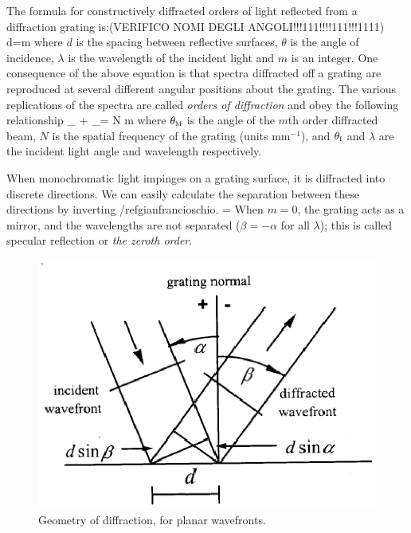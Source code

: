 The formula for constructively diffracted orders of light reflected from a diffraction grating is:(VERIFICO NOMI DEGLI ANGOLI!!!111!!!!111!!!1111)
\mate
d\sin\theta=m\lambda
\label{gianfrancioschio}
\atem
where $d$ is the spacing between reflective surfaces, $\theta$ is the angle of incidence, $\lambda$ is the wavelength of the incident light and $m$ is an integer. One consequence of the above equation is that spectra diffracted off a grating are reproduced at several different angular positions about the grating. The various replications of the spectra are called \textit{orders of diffraction} and obey the following relationship 
\mate
\sin\theta_{} + \sin\theta_{}= N m \lambda
\atem
where $\theta_{\mbox{\footnotesize{\scshape{m}}}}$ is the angle of the $m$th order diffracted beam, $N$ is the spatial frequency of the grating (units mm$^{-1}$), and $\theta_{\mbox{\footnotesize{\scshape{i}}}}$ and $\lambda$ are the incident light angle and wavelength respectively.

When monochromatic light impinges on a grating surface, it is diffracted into discrete directions.
We can easily calculate the  separation between these directions by inverting /ref{gianfrancioschio}.
\mate
\beta[\lambda]=\arcsin{}
\atem
When $m=0$, the grating acts as a mirror, and the wavelengths are not separated ($\beta=-\alpha$ for all $\lambda$); this is called specular reflection or \textit{the zeroth order}. 
\begin{figure}[!htb]\centering
\includegraphics[width=\linewidth, draft=\foto]{eps/littrow4.eps}
\caption{Geometry of diffraction, for planar wavefronts.}
\label{littrow4}
\end{figure}

